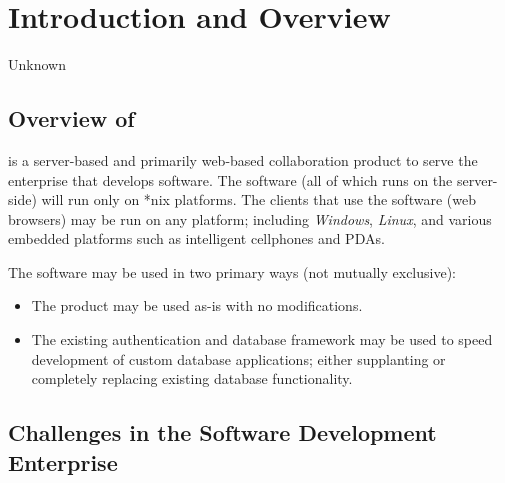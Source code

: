 
\chapter{Introduction and Overview}

\label{ciov0}

                  {Unknown}


\section{Overview of \emph{\productbasename{}}}
\label{ciov0:spov0}

\emph{\productbasename{}} is a server-based and primarily web-based
collaboration product to serve the enterprise that develops software.
The \emph{\productbasename{}} 
software (all of which runs on the server-side) will run only
on *nix platforms.  The clients that use the software (web browsers)
may be run on any platform; including \emph{Windows}, \emph{Linux}, and
various embedded platforms such as intelligent cellphones and PDAs.

The \emph{\productbasename{}} software may be used in two primary ways
(not mutually exclusive):

\begin{itemize}
\item The product may be used as-is with no modifications.
\item The existing authentication and database framework may be used
      to speed development of custom database applications; either
      supplanting or completely replacing existing database
      functionality. 
\end{itemize} 


\section{Challenges in the Software Development Enterprise}
\label{ciov0:scen0}

